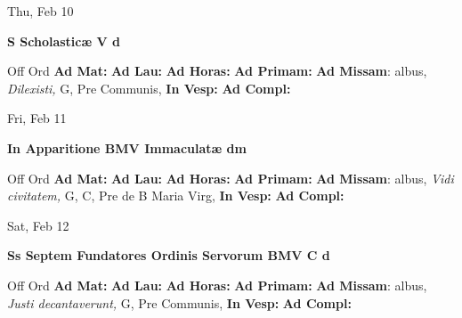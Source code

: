 \documentclass[10pt]{book}
\begin{document}
\begin{center}
\begin{minipage}{3.5in}
\vspace{2em}
\begin{center}Thu, Feb 10
\end{center}
\textbf{ \large S Scholasticæ V
\textnormal{\normalsize d}}

\begin{justify}Off Ord
\textbf{Ad Mat: }
\textbf{Ad Lau: }
\textbf{Ad Horas: }
\textbf{Ad Primam: }\textbf{Ad Missam}: albus, \textit{Dilexisti,} G, Pre Communis, 
\textbf{In Vesp: }
\textbf{Ad Compl: }
\end{justify}
\end{minipage}
\end{center}

\begin{center}
\begin{minipage}{3.5in}
\vspace{2em}
\begin{center}Fri, Feb 11
\end{center}
\textbf{ \large In Apparitione BMV Immaculatæ
\textnormal{\normalsize dm}}

\begin{justify}Off Ord
\textbf{Ad Mat: }
\textbf{Ad Lau: }
\textbf{Ad Horas: }
\textbf{Ad Primam: }\textbf{Ad Missam}: albus, \textit{Vidi civitatem,} G, C, Pre de B Maria Virg, 
\textbf{In Vesp: }
\textbf{Ad Compl: }
\end{justify}
\end{minipage}
\end{center}

\begin{center}
\begin{minipage}{3.5in}
\vspace{2em}
\begin{center}Sat, Feb 12
\end{center}
\textbf{ \large Ss Septem Fundatores Ordinis Servorum BMV C
\textnormal{\normalsize d}}

\begin{justify}Off Ord
\textbf{Ad Mat: }
\textbf{Ad Lau: }
\textbf{Ad Horas: }
\textbf{Ad Primam: }\textbf{Ad Missam}: albus, \textit{Justi decantaverunt,} G, Pre Communis, 
\textbf{In Vesp: }
\textbf{Ad Compl: }
\end{justify}
\end{minipage}
\end{center}
\end{document}
